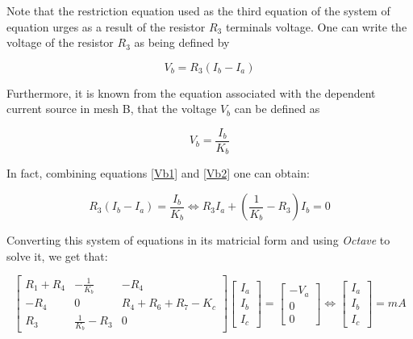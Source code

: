 Note that the restriction equation used as the third equation of the system of equation urges as a result of the resistor $R_3$ terminals voltage. One can write the voltage of the resistor $R_3$ as being defined by

\begin{equation}
    V_b = R_3 (I_b - I_a)
\label{Vb1}
\end{equation}

Furthermore, it is known from the equation associated with the dependent current source in mesh B, that the voltage $V_b$ can be defined as

\begin{equation}
    V_b = \dfrac{I_b}{K_b}
\label{Vb2}
\end{equation}

In fact, combining equations \eqref{Vb1} and \eqref{Vb2} one can obtain:

\begin{equation}
    R_3(I_b - I_a) = \dfrac{I_b}{K_b} \Longleftrightarrow R_3 I_a + \left(\dfrac{1}{K_b} - R_3\right) I_b = 0
\end{equation}

Converting this system of equations in its matricial form and using \textit{Octave} to solve it, we get that:

\begin{equation}
    \begin{bmatrix}
        R_1 + R_4 & -\frac{1}{K_b} & -R_4 \\
        -R_4 & 0 & R_4 + R_6 + R_7 - K_c \\
        R_3 & \frac{1}{K_b} - R_3 & 0
    \end{bmatrix} 
    \begin{bmatrix}
        I_a \\
        I_b \\
        I_c
    \end{bmatrix} =
    \begin{bmatrix}
        -V_a \\
        0 \\
        0
    \end{bmatrix} \Longleftrightarrow
    \begin{bmatrix}
        I_a \\
        I_b \\
        I_c
    \end{bmatrix} = 
     mA
\label{eqmalhas}
\end{equation}

